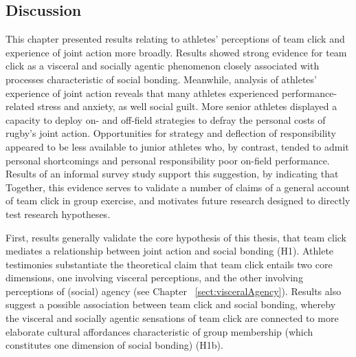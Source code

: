 \begin{CJK}{UTF8}{gbsn}
\section{Discussion}
This chapter presented results relating to athletes' perceptions of team click and experience of joint action more broadly.  Results showed strong evidence for team click as a visceral and socially agentic phenomenon closely associated with processes characteristic of social bonding.  Meanwhile, analysis of athletes' experience of joint action reveals that many athletes experienced performance-related stress and anxiety, as well social guilt.  More senior athletes displayed a capacity to deploy on- and off-field strategies to defray the personal costs of rugby's joint action.  Opportunities for strategy and deflection of responsibility appeared to be less available to junior athletes who, by contrast, tended to admit personal shortcomings and personal responsibility poor on-field performance.  Results of an informal survey study support this suggestion, by indicating that  Together, this evidence serves to validate a number of claims of a general account of team click in group exercise, and motivates future research designed to directly test research hypotheses.

First, results generally validate the core hypothesis of this thesis, that team click mediates a relationship between joint action and social bonding (H1).  Athlete testimonies substantiate the theoretical claim that team click entails two core dimensions, one involving visceral perceptions, and the other involving perceptions of (social) agency (see Chapter ~\ref{sect:visceralAgency}).  Results also suggest a possible association between team click and social bonding, whereby the visceral and socially agentic sensations of team click are connected to more elaborate cultural affordances characteristic of group membership (which constitutes one dimension of social bonding) (H1b).


\end{CJK}

